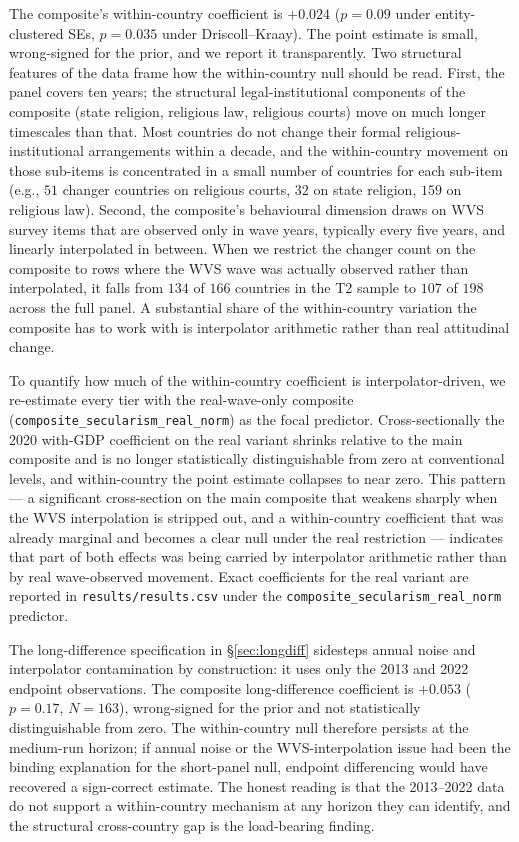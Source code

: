 \documentclass[12pt,a4paper]{article}
\begin{document}
The composite's within-country coefficient is $+0.024$ ($p = 0.09$ under entity-clustered SEs, $p = 0.035$ under Driscoll--Kraay). The point estimate is small, wrong-signed for the prior, and we report it transparently. Two structural features of the data frame how the within-country null should be read. First, the panel covers ten years; the structural legal-institutional components of the composite (state religion, religious law, religious courts) move on much longer timescales than that. Most countries do not change their formal religious-institutional arrangements within a decade, and the within-country movement on those sub-items is concentrated in a small number of countries for each sub-item (e.g., $51$ changer countries on religious courts, $32$ on state religion, $159$ on religious law). Second, the composite's behavioural dimension draws on WVS survey items that are observed only in wave years, typically every five years, and linearly interpolated in between. When we restrict the changer count on the composite to rows where the WVS wave was actually observed rather than interpolated, it falls from $134$ of $166$ countries in the T2 sample to $107$ of $198$ across the full panel. A substantial share of the within-country variation the composite has to work with is interpolator arithmetic rather than real attitudinal change.

To quantify how much of the within-country coefficient is interpolator-driven, we re-estimate every tier with the real-wave-only composite (\texttt{composite\_secularism\_real\_norm}) as the focal predictor. Cross-sectionally the 2020 with-GDP coefficient on the real variant shrinks relative to the main composite and is no longer statistically distinguishable from zero at conventional levels, and within-country the point estimate collapses to near zero. This pattern --- a significant cross-section on the main composite that weakens sharply when the WVS interpolation is stripped out, and a within-country coefficient that was already marginal and becomes a clear null under the real restriction --- indicates that part of both effects was being carried by interpolator arithmetic rather than by real wave-observed movement. Exact coefficients for the real variant are reported in \texttt{results/results.csv} under the \texttt{composite\_secularism\_real\_norm} predictor.

The long-difference specification in \S\ref{sec:longdiff} sidesteps annual noise and interpolator contamination by construction: it uses only the 2013 and 2022 endpoint observations. The composite long-difference coefficient is $+0.053$ ($p = 0.17$, $N = 163$), wrong-signed for the prior and not statistically distinguishable from zero. The within-country null therefore persists at the medium-run horizon; if annual noise or the WVS-interpolation issue had been the binding explanation for the short-panel null, endpoint differencing would have recovered a sign-correct estimate. The honest reading is that the 2013--2022 data do not support a within-country mechanism at any horizon they can identify, and the structural cross-country gap is the load-bearing finding.
\end{document}
